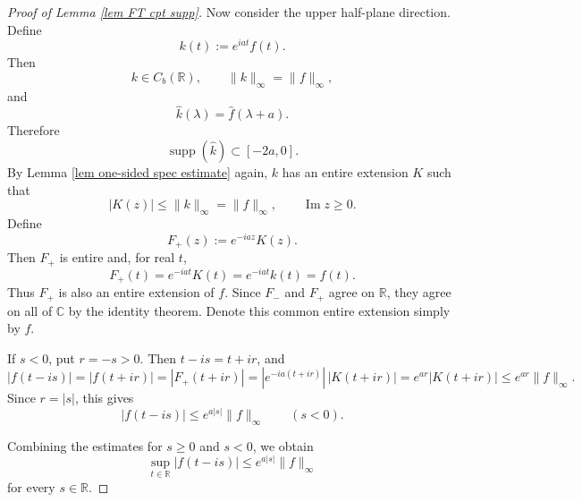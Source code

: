 \documentclass[10pt,a4paper]{amsart}
\begin{document}
\begin{proof}[Proof of Lemma \ref{lem FT cpt supp}]
Now consider the upper half-plane direction. Define
\[
        k(t):=e^{iat}f(t).
\]
Then
\[
        k\in C_b(\mathbb R),
        \qquad
        \|k\|_\infty=\|f\|_\infty,
\]
and
\[
        \widehat k(\lambda)
        =
        \widehat f(\lambda+a).
\]
Therefore
\[
        \operatorname{supp}(\widehat k)
        \subset [-2a,0].
\]
By Lemma \ref{lem one-sided spec estimate} again, \(k\) has an entire extension \(K\) such
that
\[
        |K(z)|\le \|k\|_\infty=\|f\|_\infty,
        \qquad \operatorname{Im}z\ge 0.
\]
Define
\[
        F_+(z):=e^{-iaz}K(z).
\]
Then \(F_+\) is entire and, for real \(t\),
\[
        F_+(t)
        =
        e^{-iat}K(t)
        =
        e^{-iat}k(t)
        =
        f(t).
\]
Thus \(F_+\) is also an entire extension of \(f\). Since \(F_-\) and \(F_+\)
agree on \(\mathbb R\), they agree on all of \(\mathbb C\) by the identity
theorem. Denote this common entire extension simply by \(f\).

If \(s<0\), put \(r=-s>0\). Then \(t-is=t+ir\), and
\[
        |f(t-is)|
        =
        |f(t+ir)|
        =
        |F_+(t+ir)|
        =
        |e^{-ia(t+ir)}|\,|K(t+ir)|
        =
        e^{ar}|K(t+ir)|
        \le
        e^{ar}\|f\|_\infty.
\]
Since \(r=|s|\), this gives
\[
        |f(t-is)|
        \le
        e^{a|s|}\|f\|_\infty
        \qquad (s<0).
\]

Combining the estimates for \(s\ge 0\) and \(s<0\), we obtain
\[
        \sup_{t\in\mathbb R}|f(t-is)|
        \le
        e^{a|s|}\|f\|_\infty
\]
for every \(s\in\mathbb R\).
\end{proof}
\end{document}
